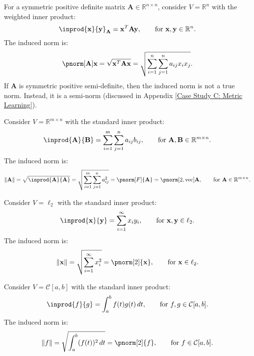 \documentclass{huhtakm-template-book-v2}
\begin{document}
    \begin{eg}
    	For a symmetric positive definite matrix $\mathbf{A} \in \mathbb{R}^{n \times n}$, consider $V = \mathbb{R}^{n}$ with the weighted inner product:
    	\begin{equation*}
    		\inprod{\mathbf{x}}{\mathbf{y}}_{\mathbf{A}} = \mathbf{x}^{T}\mathbf{A}\mathbf{y}, \qquad \text{for } \mathbf{x}, \mathbf{y} \in \mathbb{R}^{n}.
    	\end{equation*}
    	The induced norm is:
    	\begin{equation*}
    		\pnorm[\mathbf{A}]{\mathbf{x}} = \sqrt{\mathbf{x}^{T}\mathbf{A}\mathbf{x}} = \sqrt{\sum_{i=1}^{n}\sum_{j=1}^{n}a_{ij}x_{i}x_{j}}.
    	\end{equation*}
    	If $\mathbf{A}$ is symmetric positive semi-definite, then the induced norm is not a true norm. Instead, it is a semi-norm (discussed in Appendix \ref{Case Study C: Metric Learning}).
    \end{eg}
    \begin{eg}
        Consider $V = \mathbb{R}^{m \times n}$ with the standard inner product:
        \begin{equation*}
            \inprod{\mathbf{A}}{\mathbf{B}} = \sum_{i=1}^{m}\sum_{j=1}^{n}a_{ij}b_{ij}, \qquad \text{for } \mathbf{A}, \mathbf{B} \in \mathbb{R}^{m \times n}.
        \end{equation*}
        The induced norm is:
        \begin{equation*}
            \norm{\mathbf{A}} = \sqrt{\inprod{\mathbf{A}}{\mathbf{A}}} = \sqrt{\sum_{i=1}^{m}\sum_{j=1}^{n}a_{ij}^{2}} = \pnorm[F]{\mathbf{A}} = \pnorm[2, \text{vec}]{\mathbf{A}}, \qquad \text{for } \mathbf{A} \in \mathbb{R}^{m \times n}.
        \end{equation*}
    \end{eg}
    \begin{eg}
        Consider $V = \ell_{2}$ with the standard inner product:
        \begin{equation*}
            \inprod{\mathbf{x}}{\mathbf{y}} = \sum_{i=1}^{\infty}x_{i}y_{i}, \qquad \text{for } \mathbf{x}, \mathbf{y} \in \ell_{2}.
        \end{equation*}
        The induced norm is:
        \begin{equation*}
            \norm{\mathbf{x}} = \sqrt{\sum_{i=1}^{\infty}x_{i}^{2}} = \pnorm[2]{\mathbf{x}}, \qquad \text{for } \mathbf{x} \in \ell_{2}.
        \end{equation*}
    \end{eg}
    \begin{eg}
        Consider $V = \mathcal{C}[a, b]$ with the standard inner product:
        \begin{equation*}
            \inprod{f}{g} = \int_{a}^{b}f(t)g(t)\,dt, \qquad \text{for } f, g \in \mathcal{C}[a, b].
        \end{equation*}
        The induced norm is:
        \begin{equation*}
            \norm{f} = \sqrt{\int_{a}^{b}(f(t))^{2}\,dt} = \pnorm[2]{f}, \qquad \text{for } f \in \mathcal{C}[a, b].
        \end{equation*}
    \end{eg}
    \newpage
\end{document}
